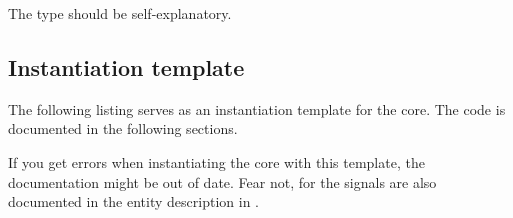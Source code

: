 The  type should be self-explanatory.

\subsection{Instantiation template}
\label{sec:core-ug-cfg-inst-template}

The following listing serves as an instantiation template for the core. The code
is documented in the following sections.

If you get errors when instantiating the core with this template, the
documentation might be out of date. Fear not, for the signals are also
documented in the entity description in .


